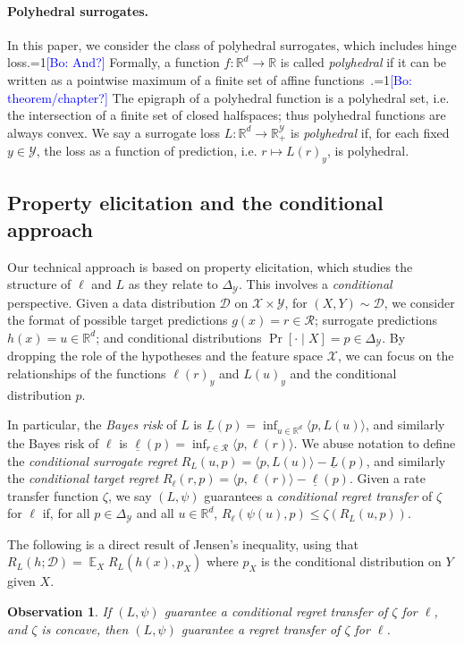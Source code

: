 \documentclass{article}
\newtheorem{observation}{Observation}
\theoremstyle{definition}\newtheorem{definition}{Definition}
\theoremstyle{definition}\newtheorem{assumption}{Assumption}
\newcommand{\Comments}{1}
\newcommand{\mynote}[2]{\ifnum\Comments=1\textcolor{#1}{#2}\fi}
\newcommand{\bo}[1]{\mynote{blue}{[Bo: #1]}}
\newcommand{\reals}{\mathbb{R}}
\newcommand{\simplex}{\Delta_\Y}
\newcommand{\D}{\mathcal{D}}
\DeclareMathOperator{\E}{\mathbb{E}}  %
\newcommand{\R}{\mathcal{R}}
\newcommand{\X}{\mathcal{X}}
\newcommand{\Y}{\mathcal{Y}}
\newcommand{\risk}[1]{\underline{#1}}
\newcommand{\inprod}[2]{\langle #1, #2 \rangle}%
\begin{document}
\paragraph{Polyhedral surrogates.}
In this paper, we consider the class of polyhedral surrogates, which includes hinge loss.\bo{And?}
Formally, a function $f: \reals^d \to \reals$ is called \emph{polyhedral} if it can be written as a pointwise maximum of a finite set of affine functions~\cite{rockafellar1997convex}.\bo{theorem/chapter?}
The epigraph of a polyhedral function is a polyhedral set, i.e. the intersection of a finite set of closed halfspaces; thus polyhedral functions are always convex.
We say a surrogate loss $L: \reals^d \to \reals_+^{\Y}$ is \emph{polyhedral} if, for each fixed $y \in \Y$, the loss as a function of prediction, i.e. $r \mapsto L(r)_y$, is polyhedral.

\subsection{Property elicitation and the conditional approach}
Our technical approach is based on property elicitation, which studies the structure of $\ell$ and $L$ as they relate to $\simplex$.
This involves a \emph{conditional} perspective.
Given a data distribution $\D$ on $\X \times \Y$, for $(X,Y) \sim \D$, we consider the format of possible target predictions $g(x) = r \in \R$; surrogate predictions $h(x) = u \in \reals^d$; and conditional distributions $\Pr[ \cdot \mid X] = p \in \simplex$.
By dropping the role of the hypotheses and the feature space $\X$, we can focus on the relationships of the functions $\ell(r)_y$ and $L(u)_y$ and the conditional distribution $p$.

In particular, the \emph{Bayes risk} of $L$ is $\risk{L}(p) = \inf_{u \in \reals^d} \inprod{p}{L(u)}$, and similarly the Bayes risk of $\ell$ is $\risk{\ell}(p) = \inf_{r \in \R} \inprod{p}{\ell(r)}$.
We abuse notation to define the \emph{conditional surrogate regret} $R_L(u,p) = \inprod{p}{L(u)} - \risk{L}(p)$, and similarly the \emph{conditional target regret} $R_{\ell}(r,p) = \inprod{p}{\ell(r)} - \risk{\ell}(p)$.
Given a rate transfer function $\zeta$, we say $(L,\psi)$ guarantees a \emph{conditional regret transfer} of $\zeta$ for $\ell$ if, for all $p \in \simplex$ and all $u \in \reals^d$, $R_{\ell}(\psi(u),p) \leq \zeta(R_L(u,p))$.

The following is a direct result of Jensen's inequality, using that $R_L(h;\D) = \E_X R_L(h(x),p_X)$ where $p_X$ is the conditional distribution on $Y$ given $X$.
\begin{observation} \label{obs:transfer}
  If $(L,\psi)$ guarantee a conditional regret transfer of $\zeta$ for $\ell$, and $\zeta$ is concave, then $(L,\psi)$ guarantee a regret transfer of $\zeta$ for $\ell$.
\end{observation}
 
\end{document}
